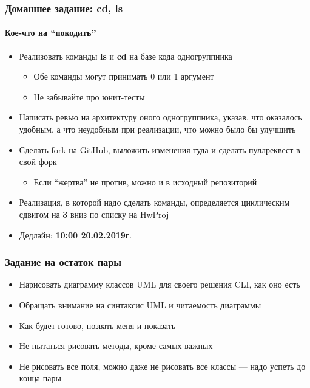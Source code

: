 \documentclass[xetex,mathserif,serif]{beamer}
\begin{document}
	\begin{frame}
		\frametitle{Домашнее задание: cd, ls}
		\framesubtitle{Кое-что на ``покодить''}
		\begin{itemize}
			\item Реализовать команды \textbf{ls} и \textbf{cd} на базе кода одногруппника
			\begin{itemize}
				\item Обе команды могут принимать 0 или 1 аргумент
				\item Не забывайте про юнит-тесты
			\end{itemize}
			\item Написать ревью на архитектуру оного одногруппника, указав, что оказалось удобным, а что неудобным при реализации, что можно было бы улучшить
			\item Сделать fork на GitHub, выложить изменения туда и сделать пуллреквест в свой форк
			\begin{itemize}
				\item Если ``жертва'' не против, можно и в исходный репозиторий
			\end{itemize}
			\item Реализация, в которой надо сделать команды, определяется циклическим сдвигом на \textbf{3} вниз по списку на HwProj
			\item Дедлайн: \textbf{10:00 20.02.2019г}.
		\end{itemize}
	\end{frame}

	\begin{frame}
		\frametitle{Задание на остаток пары}
		\begin{itemize}
			\item Нарисовать диаграмму классов UML для своего решения CLI, как оно есть
			\item Обращать внимание на синтаксис UML и читаемость диаграммы
			\item Как будет готово, позвать меня и показать
			\item Не пытаться рисовать методы, кроме самых важных
			\item Не рисовать все поля, можно даже не рисовать все классы --- надо успеть до конца пары
		\end{itemize}
	\end{frame}
\end{document}
